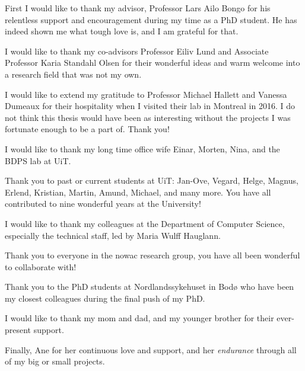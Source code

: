 \begin{acknowledgement}
    First I would like to thank my advisor, Professor Lars Ailo Bongo for his
    relentless support and encouragement during my time as a PhD student. He has
    indeed shown me what tough love is, and I am grateful for that. 

    I would like to thank my co-advisors Professor Eiliv Lund and Associate
    Professor Karia Standahl Olsen for their wonderful ideas and warm welcome
    into a research field that was not my own. 

    I would like to extend my gratitude to Professor Michael Hallett and Vanessa
    Dumeaux for their hospitality when I visited their lab in Montreal in
    2016. I do not think this thesis would have been as interesting without the
    projects I was fortunate enough to be a part of. Thank you! 

    I would like to thank my long time office wife Einar, Morten, Nina, and
    the BDPS lab at UiT. 

    Thank you to past or current students at UiT: Jan-Ove, Vegard, Helge,
    Magnus, Erlend, Kristian, Martin, Amund, Michael, and many more. You have
    all contributed to nine wonderful years at the University!
    
    I would like to thank my colleagues at the Department of Computer Science,
    especially the technical staff, led by Maria Wulff Hauglann.
    
    Thank you to everyone in the \gls{nowac} research group, you have all been
    wonderful to collaborate with! 

    Thank you to the PhD students at Nordlandssykehuset in Bodø who have been my
    closest colleagues during the final push of my PhD. 
    
    I would like to thank my mom and dad, and my younger brother for their
    ever-present support. 

    Finally, Ane for her continuous love and support, and her
    \emph{endurance} through all of my big or small projects. 
\end{acknowledgement}
